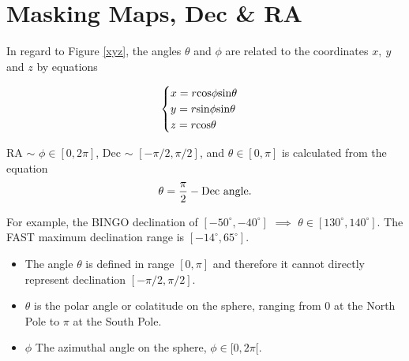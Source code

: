 \section{Masking Maps, Dec \& RA}
In regard to Figure \ref{xyz}, the angles $\theta$ and $\phi$ are related to the coordinates $x, \ y$ and $z$ by equations

\begin{equation}
 \begin{cases}
  x  =  r{\rm cos}\phi{\rm sin}\theta\\
  y  =  r{\rm sin}\phi{\rm sin}\theta\\
  z  =  r{\rm cos}\theta
 \end{cases}
\end{equation}

RA $\sim$ $\phi \in [0, 2\pi]$, Dec $\sim$ $[-\pi/2 , \pi/2]$, and $\theta \in [0, \pi]$ is calculated from the equation
\begin{equation}
 \theta = \frac{\pi}{2} - {\rm Dec \ angle}.
\end{equation}

For example, the BINGO declination of $[-50^{\circ}, -40^{\circ}]$ $\implies$ $\theta \in [130^{\circ}, 140^{\circ}]$. The FAST maximum declination range is $[-14^{\circ}, 65^{\circ}]$.

\begin{itemize}
 \item The angle $\theta$ is defined in range  $[0, \pi]$ and therefore it cannot directly represent declination $[-\pi/2,  \pi/2]$.
\item $\theta$ is the polar angle or colatitude on the sphere, ranging from $0$ at the North Pole to $\pi$ at the South Pole. 
\item $\phi$ The azimuthal angle on the sphere, $\phi\in[0,2\pi[$.
\end{itemize}

